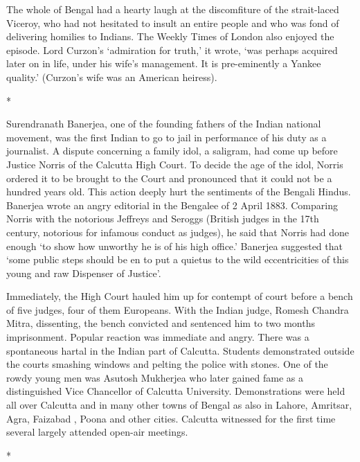 The whole of Bengal had a hearty laugh at the discomfiture of the strait-laced Viceroy, who had not hesitated to insult an entire people and who was fond of delivering homilies to Indians. The Weekly Times of London also enjoyed the episode. Lord Curzon’s ‘admiration for truth,’ it wrote, ‘was perhaps acquired later on in life, under his wife’s management. It is pre-eminently a Yankee quality.’ (Curzon’s wife was an American heiress).

\begin{center}*\end{center}



Surendranath Banerjea, one of the founding fathers of the Indian national movement, was the first Indian to go to jail in performance of his duty as a journalist. A dispute concerning a family idol, a saligram, had come up before Justice Norris of the Calcutta High Court. To decide the age of the idol, Norris ordered it to be brought to the Court and pronounced that it could not be a hundred years old. This action deeply hurt the sentiments of the Bengali Hindus. Banerjea wrote an angry editorial in the Bengalee of 2 April 1883. Comparing Norris with the notorious Jeffreys and Seroggs (British judges in the 17th century, notorious for infamous conduct as judges), he said that Norris had done enough ‘to show how unworthy he is of his high office.’ Banerjea suggested that ‘some public steps should be en to put a quietus to the wild eccentricities of this young and raw Dispenser of Justice’.

Immediately, the High Court hauled him up for contempt of court before a bench of five judges, four of them Europeans. With the Indian judge, Romesh Chandra Mitra, dissenting, the bench convicted and sentenced him to two months imprisonment. Popular reaction was immediate and angry. There was a spontaneous hartal in the Indian part of Calcutta. Students demonstrated outside the courts smashing windows and pelting the police with stones. One of the rowdy young men was Asutosh Mukherjea who later gained fame as a distinguished Vice Chancellor of Calcutta University. Demonstrations were held all over Calcutta and in many other towns of Bengal as also in Lahore, Amritsar, Agra, Faizabad , Poona and other cities. Calcutta witnessed for the first time several largely attended open-air meetings.

\begin{center}*\end{center}



